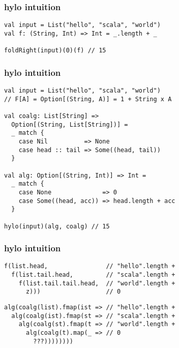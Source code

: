 \documentclass[include/preamble.tex]{subfiles}
\begin{document}
\begin{frame}[fragile]
  \frametitle{hylo intuition}
  \begin{center}
    \begin{lstlisting}[style=scala]
val input = List("hello", "scala", "world")
val f: (String, Int) => Int = _.length + _

foldRight(input)(0)(f) // 15
    \end{lstlisting}
  \end{center}
\end{frame}

\begin{frame}[fragile]
  \frametitle{hylo intuition}
  \begin{center}
    \begin{lstlisting}[style=scala]
val input = List("hello", "scala", "world")
// F[A] = Option[(String, A)] = 1 + String x A

val coalg: List[String] =>
  Option[(String, List[String])] =
  _ match {
    case Nil          => None
    case head :: tail => Some((head, tail))
  }

val alg: Option[(String, Int)] => Int =
  _ match {
    case None              => 0
    case Some((head, acc)) => head.length + acc
  }

hylo(input)(alg, coalg) // 15
    \end{lstlisting}
  \end{center}
\end{frame}

\begin{frame}[fragile]
  \frametitle{hylo intuition}
  \begin{center}
    \begin{lstlisting}[style=scala]
f(list.head,                // "hello".length +
  f(list.tail.head,         // "scala".length +
    f(list.tail.tail.head,  // "world".length +
      z)))                  // 0
    \end{lstlisting}
    \begin{lstlisting}[style=scala]
alg(coalg(list).fmap(ist => // "hello".length +
  alg(coalg(ist).fmap(st => // "scala".length +
    alg(coalg(st).fmap(t => // "world".length +
      alg(coalg(t).map(_ => // 0
        ???))))))))
    \end{lstlisting}
  \end{center}
\end{frame}
\end{document}
